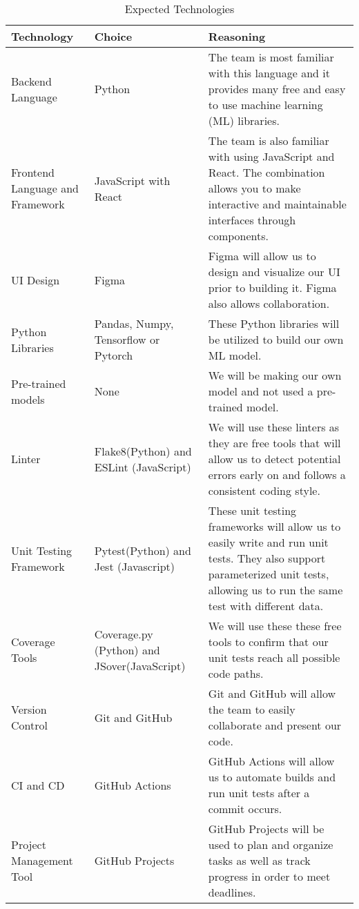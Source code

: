 \documentclass{article}
\begin{document}
\begin{table}[!htbp]
  \centering
  \caption{Expected Technologies}
  \begin{tabular}{|p{4cm}|p{4cm}|p{5cm}|}
  \hline
  \textbf{Technology} & \textbf{Choice} & \textbf{Reasoning} \\ 
  \hline
  Backend Language & Python & The team is most familiar with this language and it provides many free and easy to use machine learning (ML) libraries.\\
  \hline 
  Frontend Language and Framework & JavaScript with React & The team is also familiar with using JavaScript and React. The combination allows you to make interactive and maintainable interfaces through components. \\
  \hline
  UI Design & Figma & Figma will allow us to design and visualize our UI prior to building it. Figma also allows collaboration.\\ 
  \hline
  Python Libraries & Pandas, Numpy, Tensorflow or Pytorch & These Python libraries will be utilized to build our own ML model. \\
  \hline
  Pre-trained models & None & We will be making our own model and not used a pre-trained model.\\
  \hline 
  Linter & Flake8(Python) and ESLint (JavaScript) &  We will use these linters as they are free tools that will allow us to detect potential errors early on and follows a consistent coding style. \\
  \hline
  Unit Testing Framework & Pytest(Python) and Jest (Javascript) & These unit testing frameworks will allow us to easily write and run unit tests. \newline They also support parameterized unit tests, allowing us to run the same test with different data. \\
  \hline
  Coverage Tools & Coverage.py (Python) and JSover(JavaScript) & We will use these these free tools to confirm that our unit tests reach all possible code paths.\\
  \hline
  Version Control & Git and GitHub & Git and GitHub will allow the team to easily collaborate and present our code. \\
  \hline 
  CI and CD & GitHub Actions & GitHub Actions will allow us to automate builds and run unit tests after a commit occurs. \\
  \hline 
  Project Management Tool & GitHub Projects & GitHub Projects will be used to plan and organize tasks as well as track progress in order to meet deadlines.\\
  \hline 

\end{tabular}
\end{table}
\end{document}
